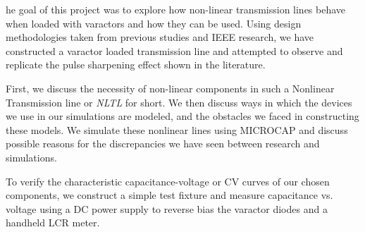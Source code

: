 \documentclass[journal]{IEEEtran} \usepackage[english]{babel}
\begin{document}

he goal of this project was to explore how non-linear
transmission lines behave when loaded with varactors and how they can be used.
Using design methodologies taken from previous studies and IEEE research, we
have constructed a varactor loaded transmission line and attempted to observe
and replicate the pulse sharpening effect shown in the literature.

First, we discuss the necessity of non-linear components in such a Nonlinear
Transmission line or \emph{NLTL} for short. We then discuss ways in which the
devices we use in our simulations are modeled, and the obstacles we faced in
constructing these models. We simulate these nonlinear lines using MICROCAP and
discuss possible reasons for the discrepancies we have seen between research and
simulations.

To verify the characteristic capacitance-voltage or CV curves of our chosen
components, we construct a simple test fixture and measure capacitance vs.
voltage using a DC power supply to reverse bias the varactor diodes and a
handheld LCR meter.



\hfill 



%
%
\end{document}
